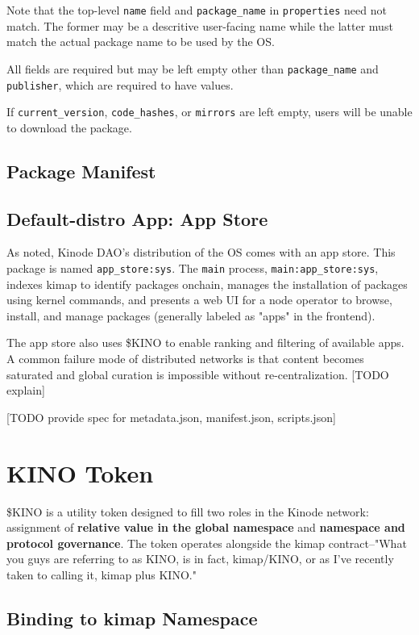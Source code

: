 \documentclass[runningheads]{llncs}
\begin{document}
Note that the top-level \verb|name| field and \verb|package_name| in \verb|properties| need not match. The former may be a descritive user-facing name while the latter must match the actual package name to be used by the OS.

All fields are required but may be left empty other than \verb|package_name| and \verb|publisher|, which are required to have values.

If \verb|current_version|, \verb|code_hashes|, or \verb|mirrors| are left empty, users will be unable to download the package.

\subsection{Package Manifest}



\subsection{Default-distro App: App Store}

As noted, Kinode DAO's distribution of the OS comes with an app store.
This package is named \verb|app_store:sys|.
The \verb|main| process, \verb|main:app_store:sys|, indexes kimap to identify packages onchain, manages the installation of packages using kernel commands, and presents a web UI for a node operator to browse, install, and manage packages (generally labeled as "apps" in the frontend).

The app store also uses \$KINO to enable ranking and filtering of available apps.
A common failure mode of distributed networks is that content becomes saturated and global curation is impossible without re-centralization. [TODO explain]


[TODO provide spec for metadata.json, manifest.json, scripts.json]

%
%
%
\section{KINO Token}

\$KINO is a utility token designed to fill two roles in the Kinode network: assignment of \textbf{relative value in the global namespace} and \textbf{namespace and protocol governance}.
The token operates alongside the kimap contract–"What you guys are referring to as KINO, is in fact, kimap/KINO, or as I've recently taken to calling it, kimap plus KINO."

\subsection{Binding to kimap Namespace}
\end{document}
